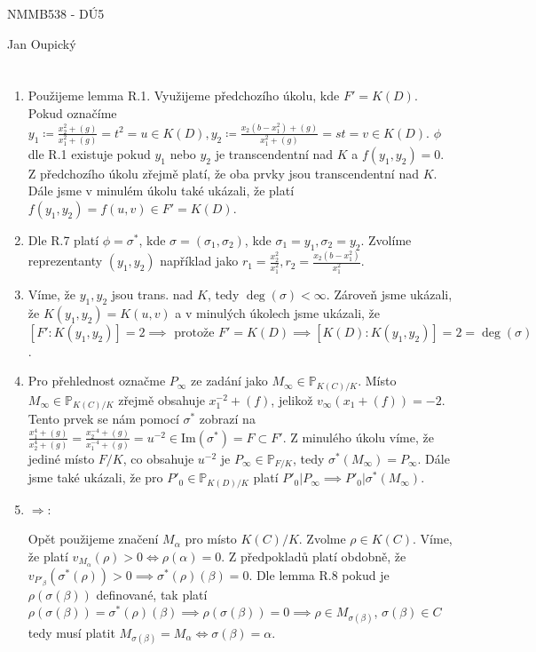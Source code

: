 \documentclass[12pt, a4paper]{article}
\begin{document}
\begin{center}
\large NMMB538 - DÚ5

\normalsize Jan Oupický
\end{center}
\vspace{1\baselineskip}

\section{}
\begin{enumerate}
    \item Použijeme lemma R.1. Využijeme předchozího úkolu, kde $F' = K(D)$. Pokud označíme $y_1 \coloneqq \frac{x_2^2 + (g)}{x_1^2 + (g)} = t^2 = u \in K(D), y_2 \coloneqq \frac{x_2(b-x_1^2) + (g)}{x_1^2 + (g)} = st = v \in K(D)$. $\phi$ dle R.1 existuje pokud $y_1$ nebo $y_2$ je transcendentní nad $K$ a $f(y_1,y_2)=0$. Z předchozího úkolu zřejmě platí, že oba prvky jsou transcendentní nad $K$. Dále jsme v minulém úkolu také ukázali, že platí $f(y_1,y_2)=f(u,v) \in F' = K(D)$.

    \item Dle R.7 platí $\phi = \sigma^*$, kde $\sigma=(\sigma_1, \sigma_2)$, kde $\sigma_1 = y_1, \sigma_2 = y_2$. Zvolíme reprezentanty $(y_1,y_2)$ například jako $r_1 = \frac{x_2^2}{x_1^2}, r_2 = \frac{x_2(b-x_1^2)}{x_1^2}$. 

    \item Víme, že $y_1,y_2$ jsou trans. nad $K$, tedy $\deg(\sigma) < \infty$. Zároveň jsme ukázali, že $K(y_1,y_2)=K(u,v)$ a v minulých úkolech jsme ukázali, že $[F':K(y_1,y_2)] = 2 \implies \text{ protože }F'=K(D)\implies [K(D):K(y_1,y_2)]=2=\deg(\sigma)$.

    \item Pro přehlednost označme $P_\infty$ ze zadání jako $M_\infty \in \mathbb{P}_{K(C)/K}$. Místo $M_\infty \in \mathbb{P}_{K(C)/K}$ zřejmě obsahuje $x_1^{-2}+(f)$, jelikož $v_{\infty}(x_1+(f))=-2$. Tento prvek se nám pomocí $\sigma^*$ zobrazí na $\frac{x_1^4+(g)}{x_2^4+(g)} = \frac{x_2^{-4}+(g)}{x_1^{-4}+(g)} = u^{-2} \in \text{Im}(\sigma^*) = F \subset F'$. Z minulého úkolu víme, že jediné místo $F/K$, co obsahuje $u^{-2}$ je $P_\infty \in \mathbb{P}_{F/K}$, tedy $\sigma^*(M_\infty)=P_\infty$. Dále jsme také ukázali, že pro $P'_0 \in \mathbb{P}_{K(D)/K}$ platí $P'_0 | P_\infty \implies P'_0 | \sigma^*(M_\infty)$.

    \item $\Rightarrow$:

    Opět použijeme značení $M_\alpha$ pro místo $K(C)/K$. Zvolme $\rho \in K(C)$. Víme, že platí $v_{M_\alpha}(\rho) > 0 \iff \rho(\alpha) = 0$. Z předpokladů platí obdobně, že $v_{P'_\beta}(\sigma^*(\rho)) > 0 \implies \sigma^*(\rho)(\beta) = 0$. Dle lemma R.8 pokud je $\rho(\sigma(\beta))$ definované, tak platí $\rho(\sigma(\beta))=\sigma^*(\rho)(\beta) \implies\rho(\sigma(\beta)) = 0 \implies \rho \in M_{\sigma(\beta)}$, $\sigma(\beta) \in C$ tedy musí platit $M_{\sigma(\beta)} = M_\alpha \iff \sigma(\beta) = \alpha$. 


\end{enumerate}
\end{document}

